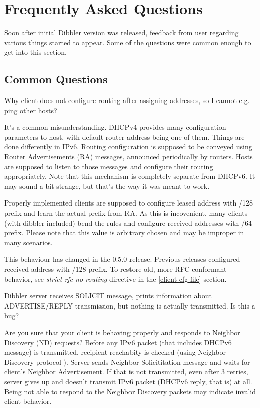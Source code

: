 
\newpage
\section{Frequently Asked Questions}

Soon after initial Dibbler version was released, feedback from user
regarding various things started to appear. Some of the questions were
common enough to get into this section.

\subsection{Common Questions}

\Q Why client does not configure routing after assigning addresses, so
I cannot e.g. ping other hosts?

\A It's a common misunderstanding. DHCPv4 provides many configuration
parameters to host, with default router address being one of
them. Things are done differently in IPv6. Routing configuration is
supposed to be conveyed using Router Advertisements (RA) messages,
announced periodically by routers. Hosts are supposed to listen to
those messages and configure their routing appropriately. Note that
this mechanism is completely separate from DHCPv6. It may sound a bit
strange, but that's the way it was meant to work. 

Properly implemented clients are supposed to configure leased address
with /128 prefix and learn the actual prefix from RA. As this is
incovenient, many clients (with dibbler included) bend the rules and
configure received addresses with /64 prefix. Please note that this
value is arbitrary chosen and may be improper in many scenarios. 

\Note This behaviour has changed in the 0.5.0 release. Previous
releases configured received address with /128 prefix. To restore old,
more RFC conformant behavior, see \emph{strict-rfc-no-routing}
directive in the \ref{client-cfg-file} section.

\vspace{0.5cm}
\Q Dibbler server receives SOLICIT message, prints information about
ADVERTISE/REPLY transmission, but nothing is actually transmitted. Is
this a bug?

\A Are you sure that your client is behaving properly and responds to
Neighbor Discovery (ND) requests? Before any IPv6 packet (that
includes DHCPv6 message) is transmitted, recipient reachabity is
checked (using Neighbor Discovery protocol \cite{rfc4861}). Server
sends Neighbor Solicititation message and waits for client's Neighbor
Advertisement. If that is not transmitted, even after 3 retries,
server gives up and doesn't transmit IPv6 packet (DHCPv6 reply, that
is) at all. Being not able to respond to the Neighbor Discovery
packets may indicate invalid client behavior.

